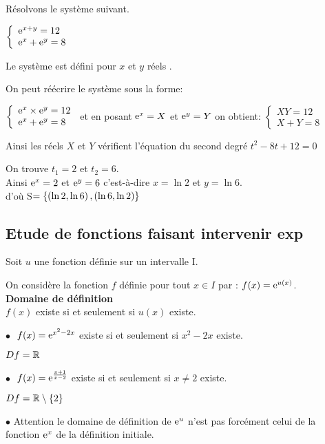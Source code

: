 \begin{example}
Résolvons le système suivant.

\medskip

$  \left\{\begin{array}{l} \mathrm{e}^{x+y}=12  \\ \mathrm{e}^{x}+\mathrm{e}^{y}=8 \end{array}\right.$

Le système est défini pour $x $ et $y $ réels .

\medskip
On peut réécrire le système  sous la forme:
\medskip

$  \left\{\begin{array}{l} \mathrm{e}^{x}\times\mathrm{e}^{y}=12  \\ \mathrm{e}^{x}+\mathrm{e}^{y}=8 \end{array}\right.$
\quad et en posant $ \mathrm{e}^{x}=X$ et $ \mathrm{e}^{y}=Y $  on obtient:\; $\left\{\begin{array}{l} XY=12 \\ X+Y=8\end{array}\right.$

\medskip

Ainsi les réels $X $ et $Y $ vérifient l'équation du second degré \; $ t^{2}-8t+12=0 $
\bigskip


On trouve  \;  $t_{1}=2  $ \;  et \;  $t_{2}=6$.\\ 

Ainsi \; $\mathrm{e}^{x}=2  $\; et\;  $ \mathrm{e}^{y}=6 $ \; c'est-à-dire \; $ x=\ln 2$ et $y=\ln 6 $.\\

d'où \; S$ =\left\{\left(\ln 2, \ln 6\right),\left(\ln 6, \ln 2\right)\right\} $

\end{example}

\subsection{Etude de fonctions faisant intervenir exp }
Soit $ u $ une fonction définie sur un intervalle I.
\medskip

On considère la fonction $ f $ définie pour tout $ x\in I $ par : \; $ f(x)=\mathrm{e}^{u(x)} $.\\
\textbf{Domaine de définition}\\
$ f(x)  $ existe  si et seulement si $ u(x) $  existe.
\begin{example}

 $ \bullet \;$ \;  $ f(x)= \mathrm{e}^{x^{2}-2x}$  existe  si et seulement si $ x^{2}-2x $  existe.


\medskip
$ Df=\mathbb{R} $

\medskip

$ \bullet \;$   $ f(x)= \mathrm{e}^{\frac{x+1}{x-2}}$  existe  si et seulement si $ x\neq2 $  existe.


\medskip
$ Df=\mathbb{R}\setminus \left\{2\right\} $
\end{example}
\begin{remark}

$ \bullet $  Attention le domaine de définition de $ \mathrm{e}^{ u} $  n'est pas  forcément celui de la fonction $ \mathrm{e}^{ x}  $  de la définition initiale.


\end{remark}


